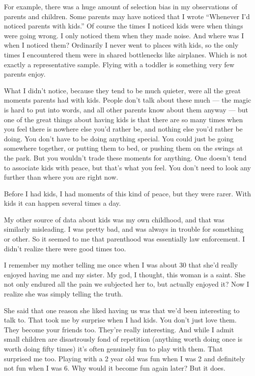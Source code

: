 \documentclass[12pt]{book}
\begin{document}
For example, there was a huge amount of selection bias in my
observations of parents and children. Some parents may have noticed that
I wrote ``Whenever I'd noticed parents with kids.'' Of course the times
I noticed kids were when things were going wrong. I only noticed them
when they made noise. And where was I when I noticed them? Ordinarily I
never went to places with kids, so the only times I encountered them
were in shared bottlenecks like airplanes. Which is not exactly a
representative sample. Flying with a toddler is something very few
parents enjoy.

What I didn't notice, because they tend to be much quieter, were all the
great moments parents had with kids. People don't talk about these much
--- the magic is hard to put into words, and all other parents know
about them anyway --- but one of the great things about having kids is
that there are so many times when you feel there is nowhere else you'd
rather be, and nothing else you'd rather be doing. You don't have to be
doing anything special. You could just be going somewhere together, or
putting them to bed, or pushing them on the swings at the park. But you
wouldn't trade these moments for anything. One doesn't tend to associate
kids with peace, but that's what you feel. You don't need to look any
further than where you are right now.

Before I had kids, I had moments of this kind of peace, but they were
rarer. With kids it can happen several times a day.

My other source of data about kids was my own childhood, and that was
similarly misleading. I was pretty bad, and was always in trouble for
something or other. So it seemed to me that parenthood was essentially
law enforcement. I didn't realize there were good times too.

I remember my mother telling me once when I was about 30 that she'd
really enjoyed having me and my sister. My god, I thought, this woman is
a saint. She not only endured all the pain we subjected her to, but
actually enjoyed it? Now I realize she was simply telling the truth.

She said that one reason she liked having us was that we'd been
interesting to talk to. That took me by surprise when I had kids. You
don't just love them. They become your friends too. They're really
interesting. And while I admit small children are disastrously fond of
repetition (anything worth doing once is worth doing fifty times) it's
often genuinely fun to play with them. That surprised me too. Playing
with a 2 year old was fun when I was 2 and definitely not fun when I was
6. Why would it become fun again later? But it does.
\end{document}
